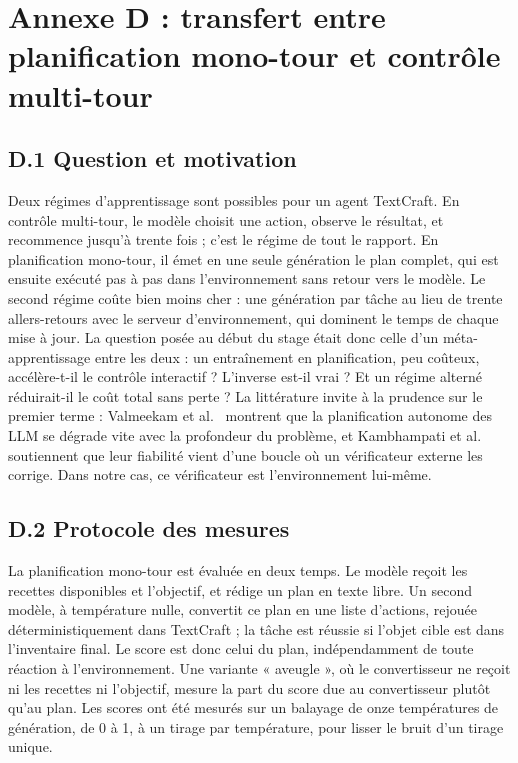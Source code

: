 \documentclass[11pt,a4paper]{article}
\begin{document}
\section{Annexe D : transfert entre planification mono-tour et contrôle multi-tour}
\label{annexe:transfert}

\subsection*{D.1 Question et motivation}
Deux régimes d'apprentissage sont possibles pour un agent TextCraft. En contrôle multi-tour, le modèle choisit une action, observe le résultat, et recommence jusqu'à trente fois ; c'est le régime de tout le rapport. En planification mono-tour, il émet en une seule génération le plan complet, qui est ensuite exécuté pas à pas dans l'environnement sans retour vers le modèle. Le second régime coûte bien moins cher : une génération par tâche au lieu de trente allers-retours avec le serveur d'environnement, qui dominent le temps de chaque mise à jour. La question posée au début du stage était donc celle d'un méta-apprentissage entre les deux : un entraînement en planification, peu coûteux, accélère-t-il le contrôle interactif ? L'inverse est-il vrai ? Et un régime alterné réduirait-il le coût total sans perte ? La littérature invite à la prudence sur le premier terme : Valmeekam et al.~\cite{valmeekam2023planning} montrent que la planification autonome des LLM se dégrade vite avec la profondeur du problème, et Kambhampati et al.~\cite{kambhampati2024llmmodulo} soutiennent que leur fiabilité vient d'une boucle où un vérificateur externe les corrige. Dans notre cas, ce vérificateur est l'environnement lui-même.

\subsection*{D.2 Protocole des mesures}
La planification mono-tour est évaluée en deux temps. Le modèle reçoit les recettes disponibles et l'objectif, et rédige un plan en texte libre. Un second modèle, à température nulle, convertit ce plan en une liste d'actions, rejouée déterministiquement dans TextCraft ; la tâche est réussie si l'objet cible est dans l'inventaire final. Le score est donc celui du plan, indépendamment de toute réaction à l'environnement. Une variante « aveugle », où le convertisseur ne reçoit ni les recettes ni l'objectif, mesure la part du score due au convertisseur plutôt qu'au plan. Les scores ont été mesurés sur un balayage de onze températures de génération, de 0 à 1, à un tirage par température, pour lisser le bruit d'un tirage unique.
\end{document}
